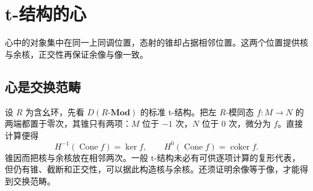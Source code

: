 
\section{t-结构的心}
\label{b4:sec:1903}

心中的对象集中在同一上同调位置，态射的锥却占据相邻位置。这两个位置提供核与余核，正交性再保证余像与像一致。


%
%

\subsection{心是交换范畴}
\label{b4:subsec:1903:01}

设 \(R\) 为含幺环，先看 \(D(R\text{-}\mathbf{Mod})\) 的标准 t-结构。把左 \(R\)-模同态 \(f:M\to N\) 的两端都置于零次，其锥只有两项：\(M\) 位于 \(-1\) 次，\(N\) 位于 \(0\) 次，微分为 \(f\)。直接计算便得
\[
	H^{-1}(\operatorname{Cone}f)=\ker f,\qquad H^0(\operatorname{Cone}f)=\operatorname{coker}f.
\]
锥因而把核与余核放在相邻两次。一般 t-结构未必有可供逐项计算的复形代表，但仍有锥、截断和正交性，可以据此构造核与余核。还须证明余像等于像，才能得到交换范畴。

